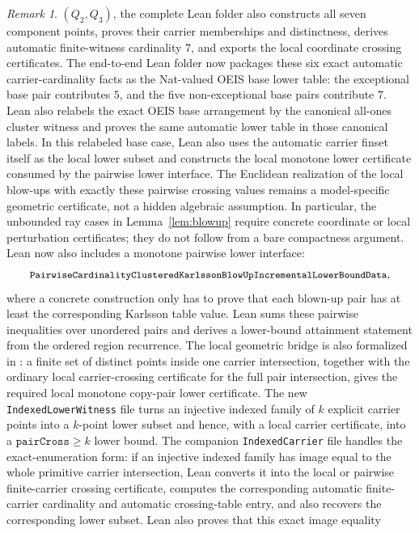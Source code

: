 \documentclass[12pt]{article}
\theoremstyle{plain}
\theoremstyle{definition}
\theoremstyle{remark}
\newtheorem{remark}[theorem]{Remark}
\begin{document}
\begin{remark}
\((Q_2,Q_3)\), the complete Lean folder also constructs all seven component
points, proves their carrier memberships and distinctness, derives automatic
finite-witness cardinality \(7\), and exports the local coordinate crossing
certificates.  The end-to-end Lean folder now packages these six exact
automatic carrier-cardinality facts as the Nat-valued OEIS base lower table:
the exceptional base pair contributes \(5\), and the five non-exceptional base
pairs contribute \(7\).  Lean also relabels the exact OEIS base arrangement by
the canonical all-ones cluster witness and proves the same automatic lower
table in those canonical labels.  In this relabeled base case, Lean also uses
the automatic carrier finset itself as the local lower subset and constructs
the local monotone lower certificate consumed by the pairwise lower interface.
The Euclidean realization of the local blow-ups with exactly these pairwise
crossing values remains a model-specific geometric certificate, not a hidden
algebraic assumption.  In particular, the unbounded ray cases in
Lemma~\ref{lem:blowup} require concrete coordinate or local perturbation
certificates; they do not follow from a bare compactness argument.  Lean now
also includes a monotone pairwise lower
interface:
\[
  {\small\texttt{PairwiseCardinalityClusteredKarlssonBlowUpIncrementalLowerBoundData}},
\]
where a concrete construction only has to prove that each blown-up pair has at
least the corresponding Karlsson table value.  Lean sums these pairwise
inequalities over unordered pairs and derives a lower-bound attainment
statement from the ordered region recurrence.  The local geometric bridge is
also formalized in
: a finite set of distinct points
inside one carrier intersection, together with the ordinary local
carrier-crossing certificate for the full pair intersection, gives the
required local monotone copy-pair lower certificate.  The new
\texttt{IndexedLowerWitness} file turns an
injective indexed family of \(k\) explicit carrier points into a \(k\)-point
lower subset and hence, with a local carrier certificate, into a
\(\texttt{pairCross}\ge k\) lower bound.  The companion
\texttt{IndexedCarrier} file handles the exact-enumeration form: if an
injective indexed family has image equal to the whole primitive carrier
intersection, Lean converts it into the local or pairwise finite-carrier
crossing certificate, computes the corresponding automatic finite-carrier
cardinality and automatic crossing-table entry, and also recovers the
corresponding lower subset.  Lean also proves that this exact image equality

\end{remark}
\end{document}
